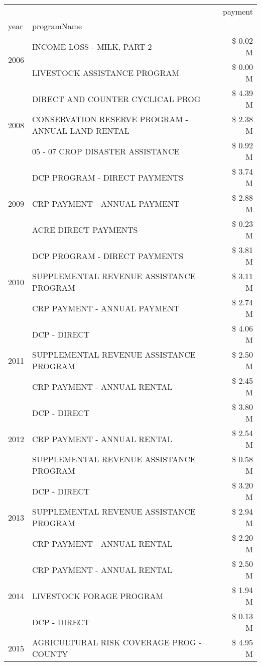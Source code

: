 \begin{tabular}{llr}
\toprule
 &  & payment \\
year & programName &  \\
\midrule
\multirow[t]{2}{*}{2006} & INCOME LOSS - MILK, PART 2 & \$ 0.02 M \\
 & LIVESTOCK ASSISTANCE PROGRAM & \$ 0.00 M \\
\cline{1-3}
\multirow[t]{3}{*}{2008} & DIRECT AND COUNTER CYCLICAL PROG & \$ 4.39 M \\
 & CONSERVATION RESERVE PROGRAM - ANNUAL LAND RENTAL & \$ 2.38 M \\
 & 05 - 07 CROP DISASTER ASSISTANCE & \$ 0.92 M \\
\cline{1-3}
\multirow[t]{3}{*}{2009} & DCP PROGRAM - DIRECT PAYMENTS & \$ 3.74 M \\
 & CRP PAYMENT - ANNUAL PAYMENT & \$ 2.88 M \\
 & ACRE DIRECT PAYMENTS & \$ 0.23 M \\
\cline{1-3}
\multirow[t]{3}{*}{2010} & DCP PROGRAM - DIRECT PAYMENTS & \$ 3.81 M \\
 & SUPPLEMENTAL REVENUE ASSISTANCE PROGRAM & \$ 3.11 M \\
 & CRP PAYMENT - ANNUAL PAYMENT & \$ 2.74 M \\
\cline{1-3}
\multirow[t]{3}{*}{2011} & DCP - DIRECT & \$ 4.06 M \\
 & SUPPLEMENTAL REVENUE ASSISTANCE PROGRAM & \$ 2.50 M \\
 & CRP PAYMENT - ANNUAL RENTAL & \$ 2.45 M \\
\cline{1-3}
\multirow[t]{3}{*}{2012} & DCP - DIRECT & \$ 3.80 M \\
 & CRP PAYMENT - ANNUAL RENTAL & \$ 2.54 M \\
 & SUPPLEMENTAL REVENUE ASSISTANCE PROGRAM & \$ 0.58 M \\
\cline{1-3}
\multirow[t]{3}{*}{2013} & DCP - DIRECT & \$ 3.20 M \\
 & SUPPLEMENTAL REVENUE ASSISTANCE PROGRAM & \$ 2.94 M \\
 & CRP PAYMENT - ANNUAL RENTAL & \$ 2.20 M \\
\cline{1-3}
\multirow[t]{3}{*}{2014} & CRP PAYMENT - ANNUAL RENTAL & \$ 2.50 M \\
 & LIVESTOCK FORAGE PROGRAM & \$ 1.94 M \\
 & DCP - DIRECT & \$ 0.13 M \\
\cline{1-3}
\multirow[t]{3}{*}{2015} & AGRICULTURAL RISK COVERAGE PROG - COUNTY & \$ 4.95 M \\

\end{tabular}
